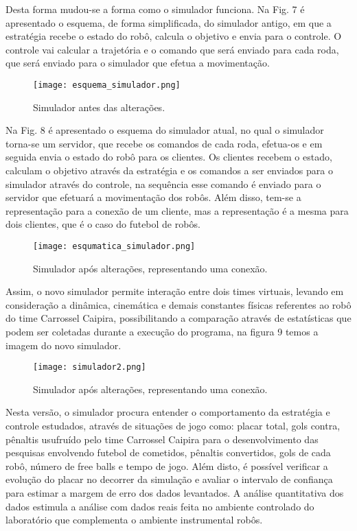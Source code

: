 Desta forma mudou-se a forma como o simulador funciona.
Na Fig. 7 é apresentado o esquema, de forma simplificada, do
simulador antigo, em que a estratégia recebe o estado do robô,
calcula o objetivo e envia para o controle. O controle vai
calcular a trajetória e o comando que será enviado para cada
roda, que será enviado para o simulador que efetua a
movimentação.

\begin{figure}[!htb]
\centering
\texttt{[image: esquema\_simulador.png]}
\caption{Simulador antes das alterações.}
\label{Rotulo}
\end{figure}

Na Fig. 8 é apresentado o esquema do simulador atual, no
qual o simulador torna-se um servidor, que recebe os
comandos de cada roda, efetua-os e em seguida envia o estado
do robô para os clientes. Os clientes recebem o estado,
calculam o objetivo através da estratégia e os comandos a ser
enviados para o simulador através do controle, na sequência
esse comando é enviado para o servidor que efetuará a
movimentação dos robôs. Além disso, tem-se a representação
para a conexão de um cliente, mas a representação é a mesma
para dois clientes, que é o caso do futebol de robôs.

\begin{figure}[!htb]
\centering
\texttt{[image: esqumatica\_simulador.png]}
\caption{ Simulador após alterações, representando uma conexão.}
\label{Rotulo}
\end{figure}

Assim, o novo simulador permite interação entre dois times
virtuais, levando em consideração a dinâmica, cinemática e
demais constantes físicas referentes ao robô do time Carrossel
Caipira, possibilitando a comparação através de estatísticas
que podem ser coletadas durante a execução do programa, na
figura 9 temos a imagem do novo simulador.

\begin{figure}[!htb]
\centering
\texttt{[image: simulador2.png]}
\caption{ Simulador após alterações, representando uma conexão.}
\label{Rotulo}
\end{figure}

Nesta versão, o simulador procura entender o
comportamento da estratégia e controle estudados, através de
situações de jogo como: placar total, gols contra, pênaltis
usufruído pelo time Carrossel Caipira para o desenvolvimento
das pesquisas envolvendo futebol de cometidos, pênaltis
convertidos, gols de cada robô, número de free balls e tempo de
jogo. Além disto, é possível verificar a evolução do placar no
decorrer da simulação e avaliar o intervalo de confiança para
estimar a margem de erro dos dados levantados. A análise
quantitativa dos dados estimula a análise com dados reais feita
no ambiente controlado do laboratório que complementa o
ambiente instrumental robôs. 

